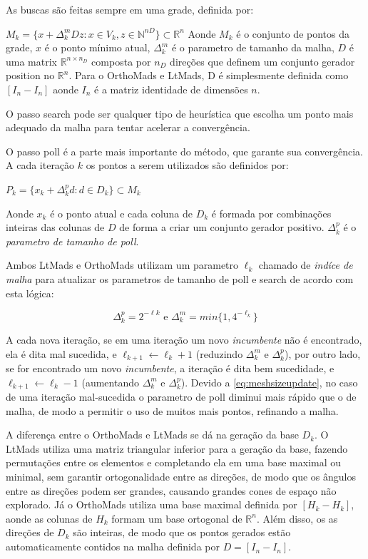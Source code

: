 As buscas são feitas sempre em uma grade, definida por:

$M_k = \{x + \Delta^m_kDz : x \in V_k, z \in \mathbb{N}^{nD} \} \subset \mathbb{R}^n$
Aonde $M_k$ é o conjunto de pontos da grade, $x$ é o ponto mínimo atual, $\Delta^m_k$ é o parametro de tamanho da malha, $D$ é uma matrix $\mathbb{R}^{n \times n_D}$ composta por $n_D$ direções que definem um conjunto gerador position no $\mathbb{R}^n$. Para o OrthoMads e LtMads, D é simplesmente definida como $[I_n -I_n]$ aonde $I_n$ é a matriz identidade de dimensões $n$.

O passo search pode ser qualquer tipo de heurística que escolha um ponto mais adequado da malha para tentar acelerar a convergência.

O passo poll é a parte mais importante do método, que garante sua convergência. A cada iteração $k$ os pontos a serem utilizados são definidos por:

\begin{center}
$P_k = \{ x_k + \Delta^p_kd : d \in D_k\} \subset M_k$
\end{center}

Aonde  $x_k$ é o ponto atual e cada coluna de $D_k$ é formada por combinações inteiras das colunas de $D$ de forma a criar um conjunto gerador positivo. $\Delta^p_k$ é o \textit{parametro de tamanho de poll}.

Ambos LtMads e OrthoMads utilizam um parametro $\ell_k$ chamado de \textit{indíce de malha} para atualizar os parametros de tamanho de poll e search de acordo com esta lógica:


\begin{equation} \label{eq:meshsizeupdate}
\Delta^p_k = 2^{-\ell k} \text{ e }  \Delta^m_k = min\{1, 4^{-\ell_k}\}
\end{equation}

A cada nova iteração, se em uma iteração um novo \textit{incumbente} não é encontrado, ela é dita mal sucedida, e $\ell_{k+1} \gets \ell_k +1$ (reduzindo $\Delta^m_k$ e $\Delta^p_k$), por outro lado, se for encontrado um novo \textit{incumbente}, a iteração é dita bem sucedidade, e $\ell_{k+1} \gets \ell_k -1$ (aumentando $\Delta^m_k$ e $\Delta^p_k$). Devido a \ref{eq:meshsizeupdate}, no caso de uma iteração mal-sucedida o parametro de poll diminui mais rápido que o de malha, de modo a permitir o uso de muitos mais pontos, refinando a malha.


A diferença entre o OrthoMads e LtMads se dá na geração da base $D_k$. O LtMads utiliza uma matriz triangular inferior para a geração da base, fazendo permutações entre os elementos e completando ela em uma base maximal ou minimal, sem garantir ortogonalidade entre as direções, de modo que os ângulos entre as direções podem ser grandes, causando grandes cones de espaço não explorado.
Já o OrthoMads utiliza uma base maximal definida por $[H_k -H_k]$, aonde as colunas de $H_k$ formam um base ortogonal de $\mathbb{R}^n$. Além disso, os as direções de $D_k$ são inteiras, de modo que os pontos gerados estão automaticamente contidos na malha definida por $D=[I_n -I_n]$.

